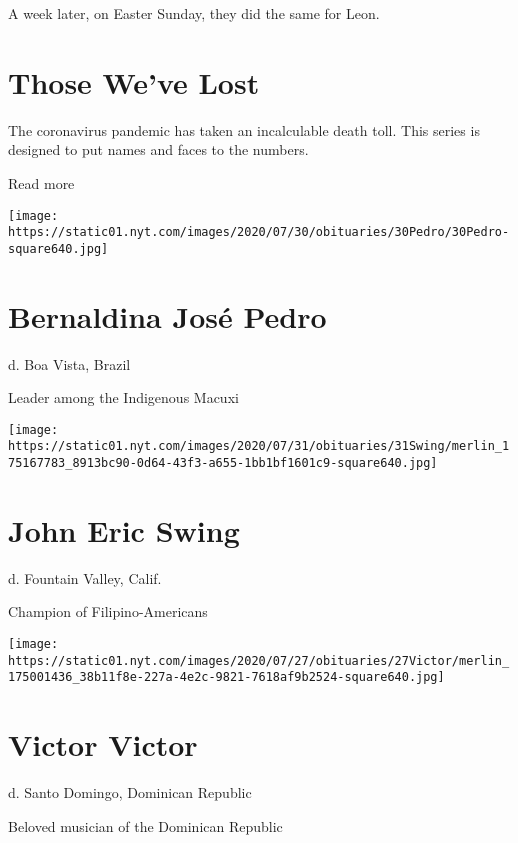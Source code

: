 A week later, on Easter Sunday, they did the same for Leon.

\href{https://www.nytimes.com/interactive/2020/obituaries/people-died-coronavirus-obituaries.html?action=click\&pgtype=Article\&state=default\&region=BELOW_MAIN_CONTENT\&context=covid_obits_promo}{}

\hypertarget{those-weve-lost}{%
\section{Those We've Lost}\label{those-weve-lost}}

The coronavirus pandemic has taken an incalculable death toll. This
series is designed to put names and faces to the numbers.

Read more

\texttt{[image: https://static01.nyt.com/images/2020/07/30/obituaries/30Pedro/30Pedro-square640.jpg]}

\hypertarget{bernaldina-josuxe9-pedro}{%
\section{Bernaldina José Pedro}\label{bernaldina-josuxe9-pedro}}

d. Boa Vista, Brazil

Leader among the Indigenous Macuxi

\texttt{[image: https://static01.nyt.com/images/2020/07/31/obituaries/31Swing/merlin\_175167783\_8913bc90-0d64-43f3-a655-1bb1bf1601c9-square640.jpg]}

\hypertarget{john-eric-swing}{%
\section{John Eric Swing}\label{john-eric-swing}}

d. Fountain Valley, Calif.

Champion of Filipino-Americans

\texttt{[image: https://static01.nyt.com/images/2020/07/27/obituaries/27Victor/merlin\_175001436\_38b11f8e-227a-4e2c-9821-7618af9b2524-square640.jpg]}

\hypertarget{victor-victor}{%
\section{Victor Victor}\label{victor-victor}}

d. Santo Domingo, Dominican Republic

Beloved musician of the Dominican Republic

